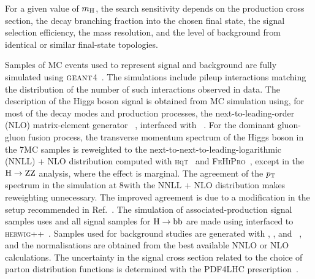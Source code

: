 \documentclass[11pt,twoside,a4paper,cmspaper,final]{cms-tdr}
\begin{document}
For a given value of $m_{\mathrm{H}}$, the search sensitivity depends on
the production cross section, the decay branching fraction into the chosen final state,
the signal selection efficiency, the mass resolution,
and the level of background from identical or similar final-state topologies.

Samples of MC events used to represent signal and background
are fully simulated using ${\textsc{geant}}$4~\cite{Agostinelli:2002hh}.
The simulations include pileup interactions matching the
distribution of the number of such interactions observed in data.
The description of the Higgs boson signal is obtained from MC
simulation using, for most of the decay modes and production processes,
the next-to-leading-order (NLO) matrix-element generator
\POWHEG~\cite{powheg1,powheg2}, interfaced with ~\cite{Sjostrand:2006za}.
For the dominant gluon-gluon fusion process, the
transverse momentum spectrum of the Higgs boson in the 7\TeV MC samples
is reweighted to the
next-to-next-to-leading-logarithmic (NNLL) + NLO distribution computed
with \textsc{h}q\textsc{t}~\cite{HqT1,Bozzi:2005wk,deFlorian:2011xf} and
\textsc{FeHiPro}~\cite{FeHiPro1,FeHiPro2},
except in the $\mathrm{H}\to\mathrm{Z}\mathrm{Z}$ analysis, where the effect is marginal.
The agreement of the $p_{\mathrm{T}}$ spectrum in the simulation at 8\TeV with
the NNLL + NLO distribution makes reweighting unnecessary.
The improved agreement is due to a modification in the \POWHEG setup
recommended in Ref.~\cite{Dittmaier:2012vm}.
The simulation of associated-production signal samples uses \PYTHIA
and all signal samples for $\mathrm{H}\to\mathrm{b}\mathrm{b}$ are made using
\POWHEG interfaced to \textsc{herwig++}~\cite{Gieseke:2006ga}.
Samples used for background studies are generated with \PYTHIA,
\POWHEG, and \MADGRAPH~\cite{Alwall:2007st}, and the normalisations are obtained from the best
available NNLO or NLO calculations.
The uncertainty in the signal cross section related to
the choice of parton distribution functions is determined with the PDF4LHC
prescription~\cite{Botje:2011sn,Alekhin:2011sk,Lai:2010vv,Martin:2009iq,Ball:2011mu}.
\end{document}
